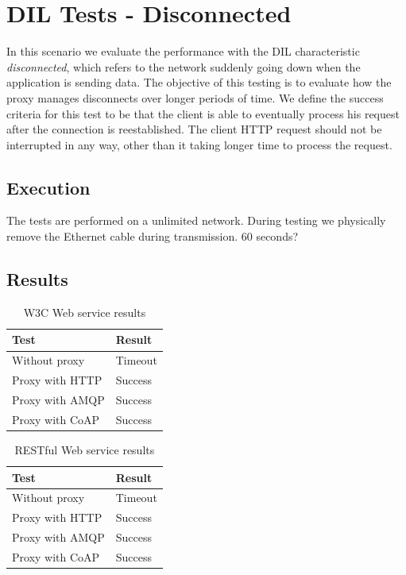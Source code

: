 \section{DIL Tests - Disconnected}

In this scenario we evaluate  the performance with the DIL characteristic
\textit{disconnected}, which refers to the network suddenly going down when the
application is sending data. The objective of this testing is to evaluate how
the proxy manages disconnects over longer periods of time. We define the success
criteria for this test to be that the client is able to eventually process his
request after the connection is reestablished. The client HTTP request should
not be interrupted in any way, other than it taking longer time to process the
request.

\subsection{Execution}

 The tests are performed on a unlimited network. During testing we physically
 remove the Ethernet cable during transmission. 60 seconds?

\subsection{Results}

\begin{table}[h!]
\begin{tabular}{| l | l |}
\hline
  \textbf{Test} & \textbf{Result} \\ \hline
  Without proxy & Timeout \\ \hline
  Proxy with HTTP & Success \\ \hline
  Proxy with AMQP & Success \\ \hline
  Proxy with CoAP & Success \\ \hline
\end{tabular}
\caption{W3C Web service results}
\end{table}

\begin{table}[h!]
\begin{tabular}{| l | l |}
\hline
  \textbf{Test} & \textbf{Result} \\ \hline
  Without proxy & Timeout \\ \hline
  Proxy with HTTP & Success \\ \hline
  Proxy with AMQP & Success \\ \hline
  Proxy with CoAP & Success \\ \hline
\end{tabular}
\caption{RESTful Web service results}
\end{table}



